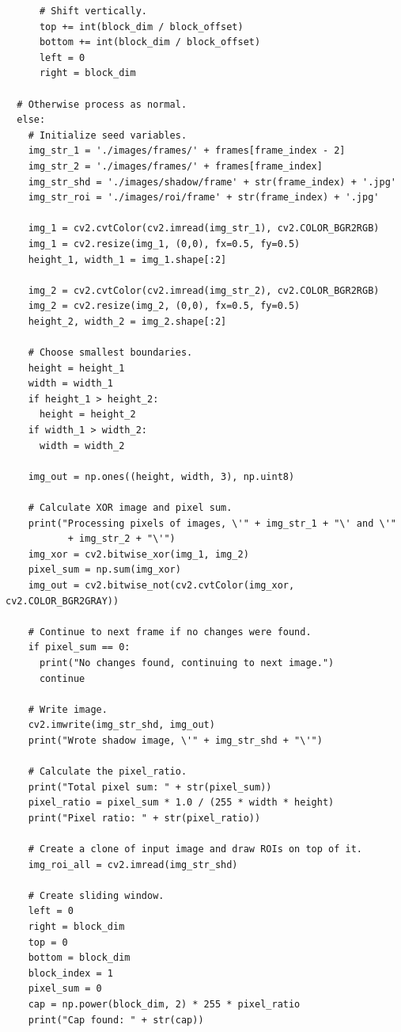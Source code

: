 \documentclass[conference]{IEEEtran}
\begin{document}
{\begin{verbatim}
      # Shift vertically.
      top += int(block_dim / block_offset)
      bottom += int(block_dim / block_offset)
      left = 0
      right = block_dim

  # Otherwise process as normal.
  else:
    # Initialize seed variables.
    img_str_1 = './images/frames/' + frames[frame_index - 2]
    img_str_2 = './images/frames/' + frames[frame_index]
    img_str_shd = './images/shadow/frame' + str(frame_index) + '.jpg'
    img_str_roi = './images/roi/frame' + str(frame_index) + '.jpg'

    img_1 = cv2.cvtColor(cv2.imread(img_str_1), cv2.COLOR_BGR2RGB)
    img_1 = cv2.resize(img_1, (0,0), fx=0.5, fy=0.5) 
    height_1, width_1 = img_1.shape[:2]

    img_2 = cv2.cvtColor(cv2.imread(img_str_2), cv2.COLOR_BGR2RGB)
    img_2 = cv2.resize(img_2, (0,0), fx=0.5, fy=0.5) 
    height_2, width_2 = img_2.shape[:2]

    # Choose smallest boundaries.
    height = height_1
    width = width_1
    if height_1 > height_2:
      height = height_2
    if width_1 > width_2:
      width = width_2

    img_out = np.ones((height, width, 3), np.uint8)

    # Calculate XOR image and pixel sum.
    print("Processing pixels of images, \'" + img_str_1 + "\' and \'"
           + img_str_2 + "\'")
    img_xor = cv2.bitwise_xor(img_1, img_2)
    pixel_sum = np.sum(img_xor)
    img_out = cv2.bitwise_not(cv2.cvtColor(img_xor, cv2.COLOR_BGR2GRAY))

    # Continue to next frame if no changes were found.
    if pixel_sum == 0:
      print("No changes found, continuing to next image.")
      continue

    # Write image.
    cv2.imwrite(img_str_shd, img_out)
    print("Wrote shadow image, \'" + img_str_shd + "\'")

    # Calculate the pixel_ratio.
    print("Total pixel sum: " + str(pixel_sum))
    pixel_ratio = pixel_sum * 1.0 / (255 * width * height)
    print("Pixel ratio: " + str(pixel_ratio))

    # Create a clone of input image and draw ROIs on top of it.
    img_roi_all = cv2.imread(img_str_shd)

    # Create sliding window.
    left = 0
    right = block_dim
    top = 0
    bottom = block_dim
    block_index = 1
    pixel_sum = 0
    cap = np.power(block_dim, 2) * 255 * pixel_ratio
    print("Cap found: " + str(cap))


\end{verbatim}}
\end{document}
